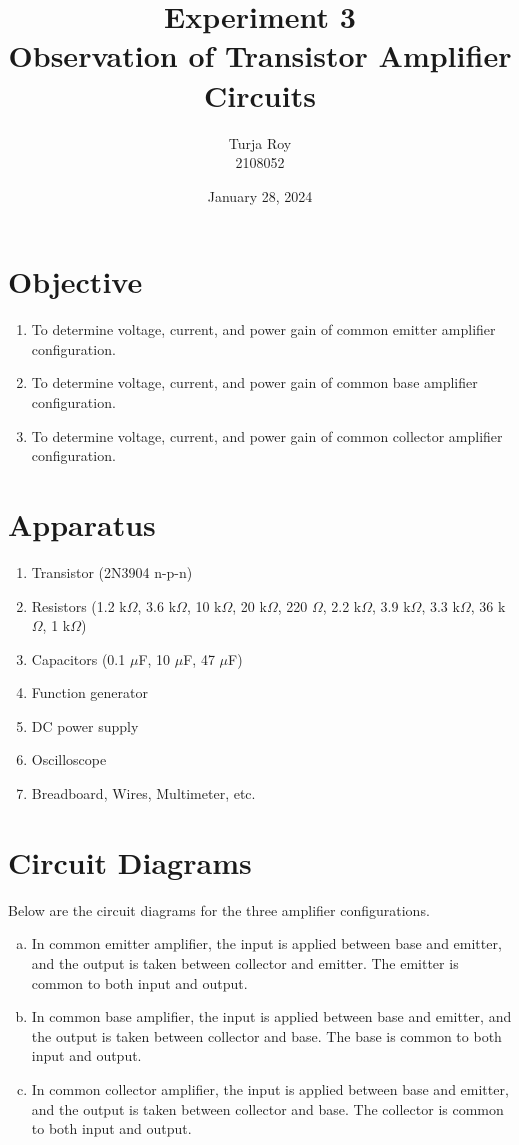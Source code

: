 \documentclass[12pt]{article}
\title{
    \textbf{Experiment 3}\\
    \textbf{Observation of Transistor Amplifier Circuits}
}
\author{
    Turja Roy\\
    2108052
}
\date{January 28, 2024}
\begin{document}
\maketitle

\section{Objective}
\begin{enumerate}
    \item To determine voltage, current, and power gain of common emitter amplifier configuration.
    \item To determine voltage, current, and power gain of common base amplifier configuration.
    \item To determine voltage, current, and power gain of common collector amplifier configuration.
\end{enumerate}

\section{Apparatus}
\begin{enumerate}
    \item Transistor (2N3904 n-p-n)
    \item Resistors (1.2 k$\Omega$, 3.6 k$\Omega$, 10 k$\Omega$, 20 k$\Omega$, 220 $\Omega$, 2.2 k$\Omega$, 3.9 k$\Omega$, 3.3 k$\Omega$, 36 k$\Omega$, 1 k$\Omega$)
    \item Capacitors (0.1 $\mu$F, 10 $\mu$F, 47 $\mu$F)
    \item Function generator
    \item DC power supply
    \item Oscilloscope
    \item Breadboard, Wires, Multimeter, etc.
\end{enumerate}

\newpage
\section{Circuit Diagrams}
Below are the circuit diagrams for the three amplifier configurations.
\begin{enumerate}[(a)]
    \item In common emitter amplifier, the input is applied between base and emitter, and the output is taken between collector and emitter. The emitter is common to both input and output.
    \item In common base amplifier, the input is applied between base and emitter, and the output is taken between collector and base. The base is common to both input and output.
    \item In common collector amplifier, the input is applied between base and emitter, and the output is taken between collector and base. The collector is common to both input and output.
\end{enumerate}
\end{document}
